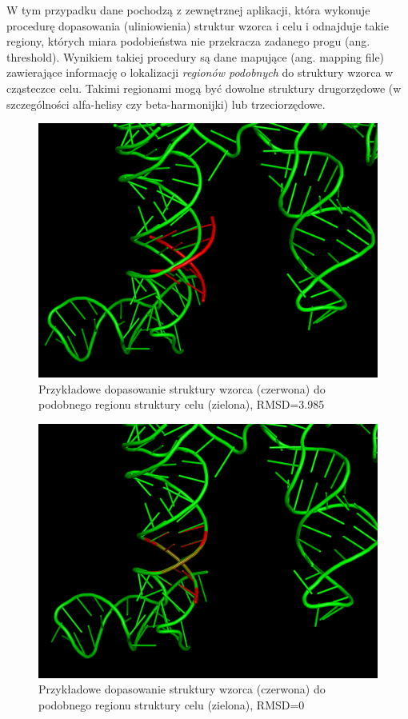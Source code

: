 \documentclass[licencjacka]{pracamgr}
\begin{document}
W tym przypadku dane pochodzą z zewnętrznej aplikacji, która wykonuje procedurę dopasowania (uliniowienia) struktur wzorca i celu i odnajduje takie regiony, których miara podobieństwa nie przekracza zadanego progu (ang. threshold). Wynikiem takiej procedury są dane mapujące (ang. mapping file) zawierające informację o lokalizacji \textit{regionów podobnych} do struktury wzorca w cząsteczce celu. Takimi regionami mogą być dowolne struktury drugorzędowe (w szczególności alfa-helisy czy beta-harmonijki) lub trzeciorzędowe.

\begin{figure}[H]
\centering
\includegraphics[scale=0.2]{rmsd3}
\caption{Przykładowe dopasowanie struktury wzorca (czerwona) do podobnego regionu struktury celu (zielona), RMSD=3.985}
\end{figure}


\begin{figure}[H]
\centering
\includegraphics[scale=0.2]{rmsd0}
\caption{Przykładowe dopasowanie struktury wzorca (czerwona) do podobnego regionu struktury celu (zielona), RMSD=0}
\end{figure}
\end{document}

